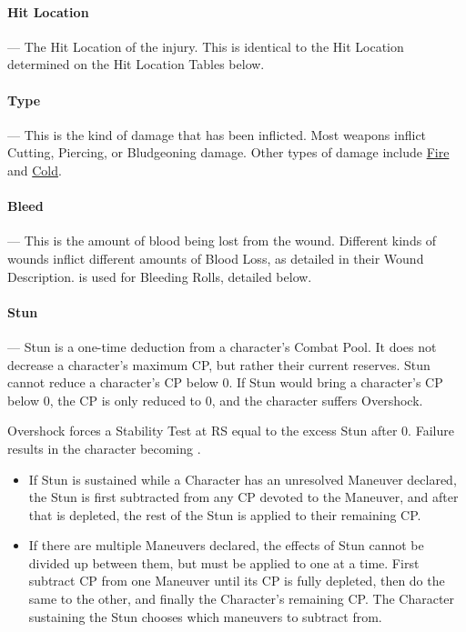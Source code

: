 \documentclass[oneside,11pt,english]{book}
\begin{document}
\paragraph{Hit Location}---\quad
The Hit Location of the injury. This is identical to the Hit Location determined on the Hit Location Tables below.

\paragraph{Type}---\quad
This is the kind of damage that has been inflicted. Most weapons inflict Cutting, Piercing, or Bludgeoning damage. Other types of damage include \hyperref[wound:Burn Damage]{Fire} and \hyperref[wound:Cold Damage]{Cold}.
\paragraph{Bleed\label{par:Bleed}}---\quad
This is the amount of blood being lost from the wound. Different kinds of wounds inflict different amounts of Blood Loss, as detailed in their Wound Description.  is used for Bleeding Rolls, detailed below. 

\paragraph{Stun\label{par:Stun}}---\quad
Stun is a one-time deduction from a character's Combat Pool. It does not decrease a character's maximum CP, but rather their current reserves. Stun cannot reduce a character's CP below 0. If Stun would bring a character's CP below 0, the CP is only reduced to 0, and the character suffers Overshock.

\label{par:Overshock}Overshock forces a Stability Test at RS equal to the excess Stun after 0. Failure results in the character becoming . %

\begin{itemize}
\item If Stun is sustained while a Character has an unresolved Maneuver declared, the Stun is first 
  subtracted from any CP devoted to the Maneuver, and after that is depleted, the rest of the Stun is 
  applied to their remaining CP. 
\item If there are multiple Maneuvers declared, the effects of Stun cannot be divided up between them, 
  but must be applied to one at a time. First subtract CP from one Maneuver until its CP is fully 
  depleted, then do the same to the other, and finally the Character’s remaining CP. The Character 
  sustaining the Stun chooses which maneuvers to subtract from. 
\end{itemize}
\end{document}
